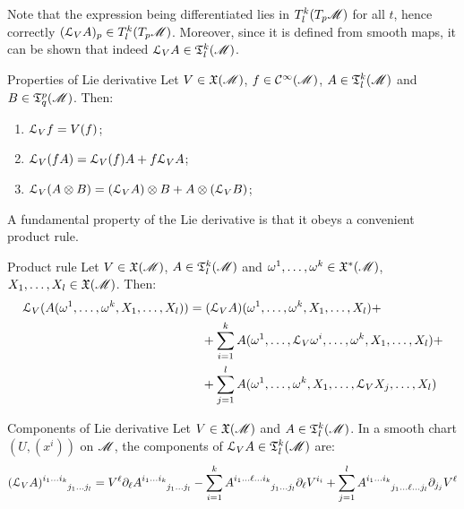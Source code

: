 Note that the expression being differentiated lies in $ T^k_l(T_p\mathscr{M}) $ for all $ t $, hence correctly $ (\EuScript{L}_V A)_p \in T^k_l(T_p\mathscr{M}) $. Moreover, since it is defined from smooth maps, it can be shown that indeed $ \EuScript{L}_V A \in \mathfrak{T}^{k}_{l}(\mathscr{M}) $.

\begin{lemma}{Properties of Lie derivative}{}
  Let $ V \in \mathfrak{X}(\mathscr{M}) $, $ f \in \mathcal{C}^{\infty}(\mathscr{M}) $, $ A \in \mathfrak{T}^{k}_{l}(\mathscr{M}) $ and $ B \in \mathfrak{T}^{p}_{q}(\mathscr{M}) $. Then:
  \begin{enumerate}
    \item \label{item:ld-prop-1} $ \EuScript{L}_V f = V(f) $;
    \item \label{item:ld-prop-2} $ \EuScript{L}_V (fA) = \EuScript{L}_V(f) A + f \EuScript{L}_V A $;
    \item \label{item:ld-prop-3} $ \EuScript{L}_V (A \otimes B) = (\EuScript{L}_V A) \otimes B + A \otimes (\EuScript{L}_V B) $;
  \end{enumerate}
\end{lemma}

A fundamental property of the Lie derivative is that it obeys a convenient product rule.

\begin{proposition}{Product rule}{}
  Let $ V \in \mathfrak{X}(\mathscr{M}) $, $ A \in \mathfrak{T}^{k}_{l}(\mathscr{M}) $ and $ \omega^1 , \dots , \omega^k \in \mathfrak{X}^*(\mathscr{M}) $, $ X_1 , \dots , X_l \in \mathfrak{X}(\mathscr{M}) $. Then:
  \begin{equation}
    \begin{split}
      \EuScript{L}_V (A(\omega^1 , \dots , \omega^k , X_1 , \dots , X_l))
      & = (\EuScript{L}_V A)(\omega^1 , \dots , \omega^k , X_1 , \dots , X_l) + \\
      & \quad + \sum_{i = 1}^k A(\omega^1 , \dots , \EuScript{L}_V \omega^i , \dots , \omega^k , X_1 , \dots , X_l) + \\
      & \quad + \sum_{j = 1}^l A(\omega^1 , \dots , \omega^k , X_1 , \dots , \EuScript{L}_V X_j , \dots , X_l)
    \end{split}
    \label{eq:tensor-prod-rule}
  \end{equation}
\end{proposition}

\begin{propcorollary}{Components of Lie derivative}{}
  Let $ V \in \mathfrak{X}(\mathscr{M}) $ and $ A \in \mathfrak{T}^{k}_{l}(\mathscr{M}) $. In a smooth chart $ (U,(x^i)) $ on $ \mathscr{M} $, the components of $ \EuScript{L}_V A \in \mathfrak{T}^{k}_{l}(\mathscr{M}) $ are:
  \begin{equation}
    \tensor{(\ld_V A)}{^{i_1 \dots i_k}_{j_1 \dots j_l}} = V^\ell \pa_\ell \tensor{A}{^{i_1 \dots i_k}_{j_1 \dots j_l}} - \sum_{i = 1}^k \tensor{A}{^{i_1 \dots \ell \dots i_k}_{j_1 \dots j_l}} \pa_\ell V^{i_i} + \sum_{j = 1}^l \tensor{A}{^{i_1 \dots i_k}_{j_1 \dots \ell \dots j_l}} \pa_{j_j} V^\ell
    \label{eq:tensor-lie-der}
  \end{equation}
\end{propcorollary}

